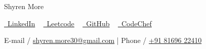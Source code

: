 \documentclass[a4,10pt]{article}
\begin{document}

\begin{flushleft}

    \begin{minipage}[b]{0.5\textwidth}
    {\Huge Shyren More} \\ 
    \end{minipage}%

    \faLinkedin \href{https://linkedin.com/in/shyrenmore/}{\raisebox{-0.2\height}\ LinkedIn} ~ 
    \faLaptopCode \href{https://leetcode.com/shyren_more/}{\raisebox{-0.2\height}\ Leetcode}  ~ 
    \faGithub \href{https://github.com/ShyrenMore}{\raisebox{-0.2\height}\ GitHub}  ~ 
    \faCreativeCommons 
    \href{https://www.codechef.com/users/shyren_more}{\raisebox{-0.2\height}\ CodeChef} ~
    
     
    \vspace{0.1cm}
    E-mail / \href{mailto:shyren.more30@gmail.com}{shyren.more30@gmail.com} | Phone / \href{tel:8169622410}{+91 81696 22410}
    
\end{flushleft}
             
             
    
\end{document}
